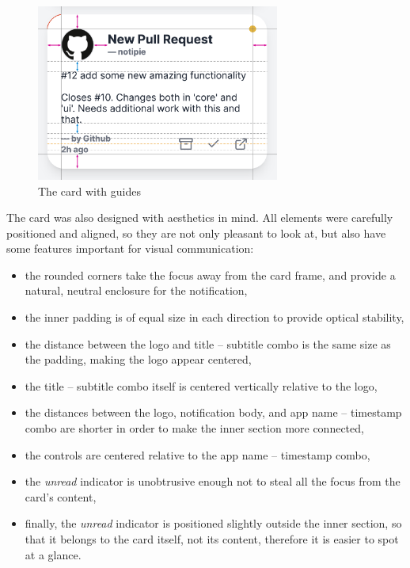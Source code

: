 \begin{figure}
  \centering
  \includegraphics[width=8cm,keepaspectratio]{./img/card_guides.png}
  \caption{The card with guides}
\end{figure}

The card was also designed with aesthetics in mind. All elements were
carefully positioned and aligned, so they are not only pleasant to look
at, but also have some features important for visual communication:

\begin{itemize}
  \item
    the rounded corners take the focus away from the card frame, and
    provide a natural, neutral enclosure for the notification,
  \item
    the inner padding is of equal size in each direction to provide
    optical stability,
  \item
    the distance between the logo and title -- subtitle combo is the same
    size as the padding, making the logo appear centered,
  \item
    the title -- subtitle combo itself is centered vertically relative to
    the logo,
  \item
    the distances between the logo, notification body, and app name --
    timestamp combo are shorter in order to make the inner section more
    connected,
  \item
    the controls are centered relative to the app name -- timestamp combo,
  \item
    the \emph{unread} indicator is unobtrusive enough not to steal all the
    focus from the card's content,
  \item
    finally, the \emph{unread} indicator is positioned slightly outside
    the inner section, so that it belongs to the card itself, not its
    content, therefore it is easier to spot at a glance.
\end{itemize}

